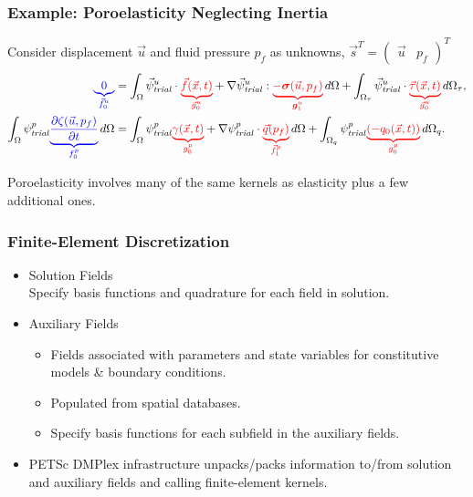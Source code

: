 \documentclass[aspectratio=169,hyperref=colorlinks]{beamer}
\newcommand{\annotateL}[2]{%
  {\color{blue}\underbrace{\color{blue}#1}_{\color{blue}\mathclap{#2}}}}
\newcommand{\annotateR}[2]{%
  {\color{red}\underbrace{\color{red}#1}_{\color{red}\mathclap{#2}}}}
\newcommand{\trialvec}[1][]{{\vec{\psi}_\mathit{trial}^{#1}}}
\newcommand{\trialscalar}[1][]{{\psi_\mathit{trial}^{#1}}}
\newcommand{\tensor}[1]{\bm{#1}}
\begin{document}
\begin{frame}
  \frametitle{Example: Poroelasticity Neglecting Inertia}
  \summary{}

      Consider displacement $\vec{u}$ and fluid pressure $p_f$ as
      unknowns, $\vec{s}^T = \left( \begin{array}{cc} \vec{u} & p_f \end{array} \right)^T$
      \begin{align}
        \annotateL{0}{\vec{f}_0^u} &= \int_\Omega \trialvec[u] \cdot \annotateR{\vec{f}(\vec{x},t)}{\vec{g}^u_0} + \nabla \trialvec[u] : \annotateR{-\tensor{\sigma}(\vec{u},p_f)}{\tensor{g}^u_1} \, d\Omega + \int_{\Omega_\tau} \trialvec[u] \cdot \annotateR{\vec{\tau}(\vec{x},t)}{\vec{g}^u_0} \, d\Omega_\tau, \\
%
 \int_\Omega  \trialscalar[p] \annotateL{\frac{\partial \zeta(\vec{u},p_f)}{\partial t}}{f^p_0} \, d\Omega &= 
 \int_\Omega \trialscalar[p] \annotateR{\gamma(\vec{x},t)}{g^p_0} + \nabla \trialscalar[p] \cdot \annotateR{\vec{q}(p_f)}{\vec{f}^p_1} \, d\Omega
 + \int_{\Omega_q} \trialscalar[p] \annotateR{(-q_0(\vec{x},t))}{g^p_0} \, d\Omega_q.
      \end{align}

      Poroelasticity involves many of the same kernels as elasticity plus a few additional ones.

\end{frame}

\begin{frame}
  \frametitle{Finite-Element Discretization}

  \begin{itemize}
  \item Solution Fields \\
    Specify basis functions and quadrature for each field in solution.
  \item Auxiliary Fields 
    \begin{itemize}
    \item Fields associated with parameters and state variables for constitutive models \& boundary conditions.
    \item Populated from spatial databases.
    \item Specify basis functions for each subfield in the auxiliary fields.
    \end{itemize}
  \item PETSc DMPlex infrastructure unpacks/packs
    information to/from solution and auxiliary fields and calling
    finite-element kernels.
  \end{itemize}


\end{frame}
\end{document}
